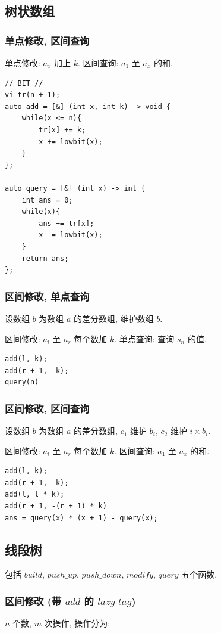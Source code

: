 \documentclass[UTF8, a4paper, titlepage, twoside]{ctexart}
\begin{document}
\subsection{ 树状数组 }

\subsubsection{ 单点修改, 区间查询 }
单点修改: $a_x$ 加上 $k$.
区间查询: $a_1$ 至 $a_x$ 的和.
\begin{lstlisting}[style = cpp]
// BIT //
vi tr(n + 1);
auto add = [&] (int x, int k) -> void {
    while(x <= n){
        tr[x] += k;
        x += lowbit(x);
    }
};

auto query = [&] (int x) -> int {
    int ans = 0;
    while(x){
        ans += tr[x];
        x -= lowbit(x);
    }
    return ans;
};
\end{lstlisting}

\subsubsection{ 区间修改, 单点查询 }
设数组 $b$ 为数组 $a$ 的差分数组, 维护数组 $b$.

区间修改: $a_l$ 至 $a_r$ 每个数加 $k$.
单点查询: 查询 $s_n$ 的值.
\begin{lstlisting}[style = cpp]
add(l, k);
add(r + 1, -k);
query(n)
\end{lstlisting}

\subsubsection{ 区间修改, 区间查询 }
设数组 $b$ 为数组 $a$ 的差分数组, $c_1$ 维护 $b_i$, $c_2$ 维护 $i \times b_i$.

区间修改: $a_l$ 至 $a_r$ 每个数加 $k$.
区间查询: $a_1$ 至 $a_x$ 的和.
\begin{lstlisting}[style = cpp]
add(l, k);
add(r + 1, -k);
add(l, l * k);
add(r + 1, -(r + 1) * k)
ans = query(x) * (x + 1) - query(x);
\end{lstlisting}

\subsection{ 线段树 }
包括 $build$, $push\_up$, $push\_down$, $modify$, $query$ 五个函数. 

\subsubsection{ 区间修改 (带 $add$ 的 $lazy\_tag $) }
$n$ 个数, $m$ 次操作, 操作分为:
\end{document}
